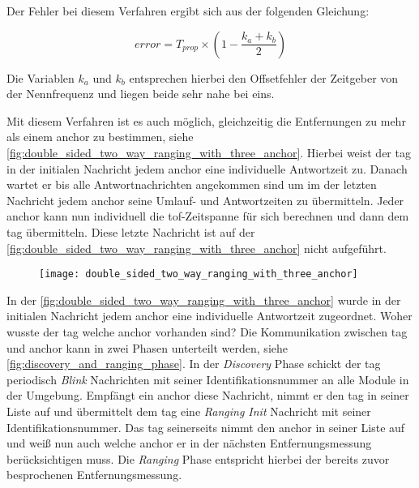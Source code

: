 Der Fehler bei diesem Verfahren ergibt sich aus der folgenden Gleichung:

\begin{equation}
error=T_{prop}\times\left(1-\frac{k_a+k_b}{2}\right)
\end{equation}

Die Variablen $k_a$ und $k_b$ entsprechen hierbei den Offsetfehler der Zeitgeber von der Nennfrequenz und liegen beide sehr nahe bei eins.

Mit diesem Verfahren ist es auch möglich, gleichzeitig die Entfernungen zu mehr als einem \Gls{anchor} zu bestimmen, siehe \autoref{fig:double_sided_two_way_ranging_with_three_anchor}. Hierbei weist der \Gls{tag} in der initialen Nachricht jedem \Gls{anchor} eine individuelle Antwortzeit zu. Danach wartet er bis alle Antwortnachrichten angekommen sind um im der letzten Nachricht jedem \Gls{anchor} seine Umlauf- und Antwortzeiten zu übermitteln. Jeder \Gls{anchor} kann nun individuell die \Gls{tof}-Zeitspanne für sich berechnen und dann dem \Gls{tag} übermitteln. Diese letzte Nachricht ist auf der \autoref{fig:double_sided_two_way_ranging_with_three_anchor} nicht aufgeführt.

\begin{figure}
	\centering
	\texttt{[image: double\_sided\_two\_way\_ranging\_with\_three\_anchor]}
	\label{fig:double_sided_two_way_ranging_with_three_anchor}
\end{figure}

In der \autoref{fig:double_sided_two_way_ranging_with_three_anchor} wurde in der initialen Nachricht jedem \Gls{anchor} eine individuelle Antwortzeit zugeordnet. Woher wusste der \Gls{tag} welche \Gls{anchor} vorhanden sind? Die Kommunikation zwischen \Gls{tag} und \Gls{anchor} kann in zwei Phasen unterteilt werden, siehe \autoref{fig:discovery_and_ranging_phase}. In der \textit{Discovery} Phase schickt der \Gls{tag} periodisch \textit{Blink} Nachrichten mit seiner Identifikationsnummer an alle Module in der Umgebung. Empfängt ein \Gls{anchor} diese Nachricht, nimmt er den \Gls{tag} in seiner Liste auf und übermittelt dem \Gls{tag} eine \textit{Ranging Init} Nachricht mit seiner Identifikationsnummer. Das \Gls{tag} seinerseits nimmt den \Gls{anchor} in seiner Liste auf und weiß nun auch welche \Gls{anchor} er in der nächsten Entfernungsmessung berücksichtigen muss. Die \textit{Ranging} Phase entspricht hierbei der bereits zuvor besprochenen Entfernungsmessung.

